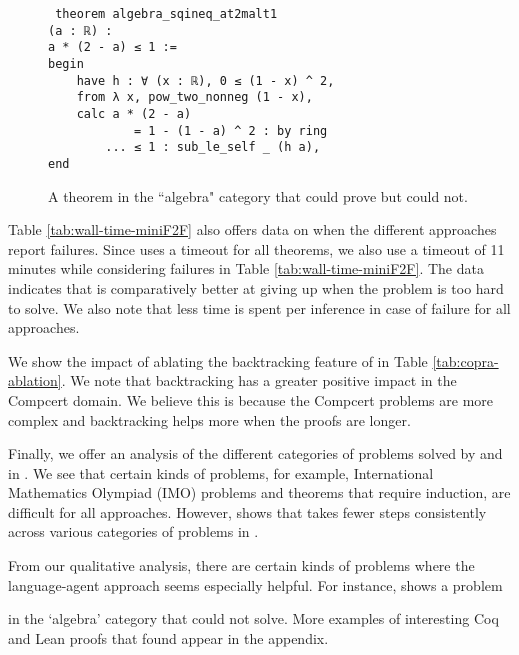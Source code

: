 \begin{wrapfigure}{l}{3in}
\vspace{-0.1in}
\begin{mdframed}[roundcorner=10pt]
\begin{lstlisting}
 theorem algebra_sqineq_at2malt1
(a : ℝ) :
a * (2 - a) ≤ 1 :=
begin
    have h : ∀ (x : ℝ), 0 ≤ (1 - x) ^ 2,
    from λ x, pow_two_nonneg (1 - x),
    calc a * (2 - a)
            = 1 - (1 - a) ^ 2 : by ring
        ... ≤ 1 : sub_le_self _ (h a),
end
\end{lstlisting}
\end{mdframed}
\caption{A theorem in the ``algebra" category that \system could prove but \reprover could not.}
\label{fig:appendix-miniF2F-example}
\end{wrapfigure}



Table \ref{tab:wall-time-miniF2F} also offers data on when the different approaches report failures. 
Since \reprover uses a timeout for all theorems, we also use a timeout of 11 minutes while considering failures in Table \ref{tab:wall-time-miniF2F}. The data indicates that \copra is comparatively better at giving up when the problem is too hard to solve. We also note that less time is spent per inference in case of failure for all approaches. 

We show the impact of ablating the backtracking feature of \copra in Table \ref{tab:copra-ablation}. We note that backtracking has a greater positive impact in the Compcert domain. We believe this is because the Compcert problems are more complex and 
backtracking helps more when the proofs are longer.


Finally, we offer an analysis of the different categories of  problems solved by \copra and \reprover in .
We see that certain kinds of problems, for example, International Mathematics Olympiad (IMO) problems and theorems that require induction, 
are difficult for all approaches.
However,  shows that \system takes fewer steps consistently across various categories of problems in .

From our qualitative analysis, there are certain kinds of problems where the language-agent approach seems especially helpful.
For instance,  shows a problem

in the `algebra' category that \reprover could not solve. More examples of interesting Coq and Lean proofs that \copra found appear in the appendix. 


